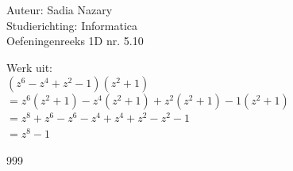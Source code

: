 \documentclass[a4paper]{article}
\begin{document}
  
\noindent \large Auteur: Sadia Nazary  \\
\noindent \large Studierichting: Informatica\\
\noindent \large Oefeningenreeks 1D nr. 5.10\\

\medskip

\normalsize

Werk uit:\\

$(z^6 - z^4 + z^2 - 1)(z^2 + 1)$\\

$= z^6(z^2+1) - z^4(z^2+1) + z^2(z^2+1) - 1(z^2+1)$\\

$= z^8 + z^6 - z^6 - z^4 + z^4 + z^2 - z^2 - 1$\\

$= z^8 - 1$

\begin{thebibliography}{999}
\end{thebibliography}
\end{document}
